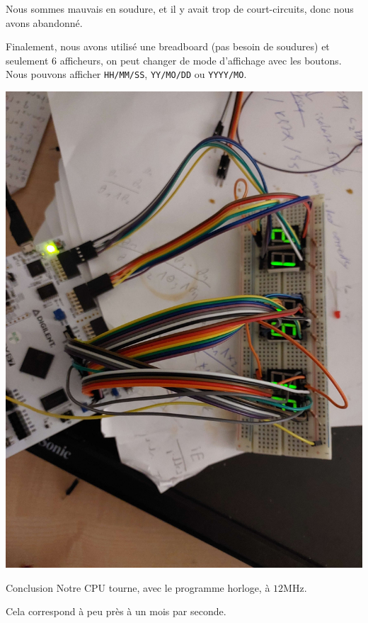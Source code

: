 \documentclass{beamer}
\begin{document}
\begin{frame}[fragile]
  Nous sommes mauvais en soudure, et il y avait trop de court-circuits,
  donc nous avons abandonné.\par
  Finalement, nous avons utilisé une breadboard (pas besoin de
  soudures) et seulement 6 afficheurs, on peut changer de mode
  d'affichage avec les boutons. Nous pouvons afficher \verb|HH/MM/SS|,
  \verb|YY/MO/DD| ou \verb|YYYY/MO|.
  \begin{center}
    \includegraphics[angle=90,scale=0.04]{pictures/FPGA final.jpg}
  \end{center}
\end{frame}
\begin{frame}{Conclusion}
  Notre CPU tourne, avec le programme horloge, à \(12\mathrm{MHz}\).\par
  Cela correspond à peu près à un mois par seconde.
\end{frame}
\end{document}
